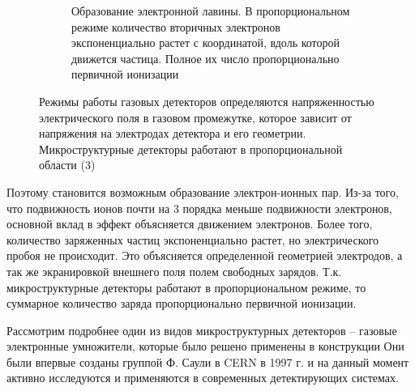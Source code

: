 \begin{figure}[h]
\begin{subfigure}{.45\textwidth}
		\caption{Образование электронной лавины. В пропорциональном режиме количество вторичных электронов экспоненциально растет с координатой, вдоль которой движется частица. Полное их число пропорционально первичной ионизации}
	\end{subfigure}%
	\caption{Режимы работы газовых детекторов определяются напряженностью электрического поля в газовом промежутке, которое зависит от напряжения на электродах детектора и его геометрии. Микроструктурные детекторы работают в пропорциональной области (3)}
	\label{fig:gas_discharge}
\end{figure}
 Поэтому становится возможным образование электрон-ионных пар. Из-за того, что подвижность ионов почти на 3 порядка меньше подвижности электронов, основной вклад в эффект объясняется движением электронов. Более того, количество заряженных частиц экспоненциально растет, но электрического пробоя не происходит. Это объясняется определенной геометрией электродов, а так же экранировкой внешнего поля полем свободных зарядов. Т.к. микроструктурные детекторы работают в пропорциональном режиме, то суммарное количество заряда пропорционально первичной ионизации.
 \par Рассмотрим подробнее один из видов микроструктурных детекторов -- газовые электронные умножители, которые было решено применены в конструкции  Они были впервые созданы группой Ф. Саули в CERN в 1997 г. и на данный момент активно исследуются и применяются в современных детектирующих системах. 
